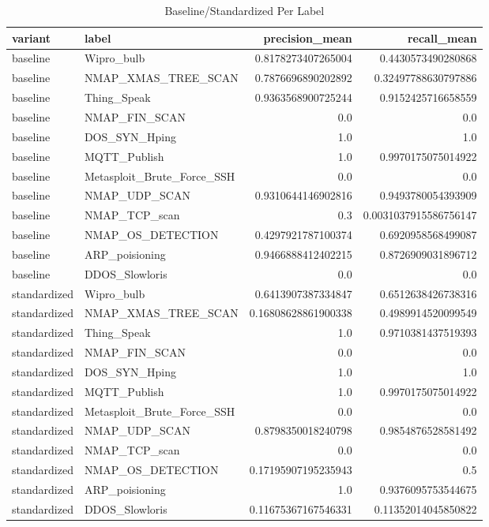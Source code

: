 \documentclass[11pt]{article}
\begin{document}
\begin{table}[H]
	\centering
	\begin{tabular}{ | l | l | r | r | }
		\hline
		\textbf{variant} & \textbf{label} & \textbf{precision\_mean} & \textbf{recall\_mean} \\
		\hline		
		baseline & Wipro\_bulb & 0.8178273407265004 & 0.4430573490280868 \\
		\hline
		baseline & NMAP\_XMAS\_TREE\_SCAN & 0.7876696890202892 & 0.32497788630797886 \\
		\hline
		baseline & Thing\_Speak & 0.9363568900725244 & 0.9152425716658559 \\
		\hline
		baseline & NMAP\_FIN\_SCAN & 0.0 & 0.0 \\
		\hline
		baseline & DOS\_SYN\_Hping & 1.0 & 1.0 \\
		\hline
		baseline & MQTT\_Publish & 1.0 & 0.9970175075014922 \\
		\hline
		baseline & Metasploit\_Brute\_Force\_SSH & 0.0 & 0.0 \\
		\hline
		baseline & NMAP\_UDP\_SCAN & 0.9310644146902816 & 0.9493780054393909 \\
		\hline
		baseline & NMAP\_TCP\_scan & 0.3 & 0.0031037915586756147 \\
		\hline
		baseline & NMAP\_OS\_DETECTION & 0.4297921787100374 & 0.6920958568499087 \\
		\hline
		baseline & ARP\_poisioning & 0.9466888412402215 & 0.8726909031896712 \\
		\hline
		baseline & DDOS\_Slowloris & 0.0 & 0.0 \\
		\hline
		standardized & Wipro\_bulb & 0.6413907387334847 & 0.6512638426738316 \\
		\hline
		standardized & NMAP\_XMAS\_TREE\_SCAN & 0.16808628861900338 & 0.4989914520099549 \\
		\hline
		standardized & Thing\_Speak & 1.0 & 0.9710381437519393 \\
		\hline
		standardized & NMAP\_FIN\_SCAN & 0.0 & 0.0 \\
		\hline
		standardized & DOS\_SYN\_Hping & 1.0 & 1.0 \\
		\hline
		standardized & MQTT\_Publish & 1.0 & 0.9970175075014922 \\
		\hline
		standardized & Metasploit\_Brute\_Force\_SSH & 0.0 & 0.0 \\
		\hline
		standardized & NMAP\_UDP\_SCAN & 0.8798350018240798 & 0.9854876528581492 \\
		\hline
		standardized & NMAP\_TCP\_scan & 0.0 & 0.0 \\
		\hline
		standardized & NMAP\_OS\_DETECTION & 0.17195907195235943 & 0.5 \\
		\hline
		standardized & ARP\_poisioning & 1.0 & 0.9376095753544675 \\
		\hline
		standardized & DDOS\_Slowloris & 0.11675367167546331 & 0.11352014045850822 \\
		\hline
	\end{tabular}
\caption{Baseline/Standardized Per Label}
\end{table}	
		
\end{document}
